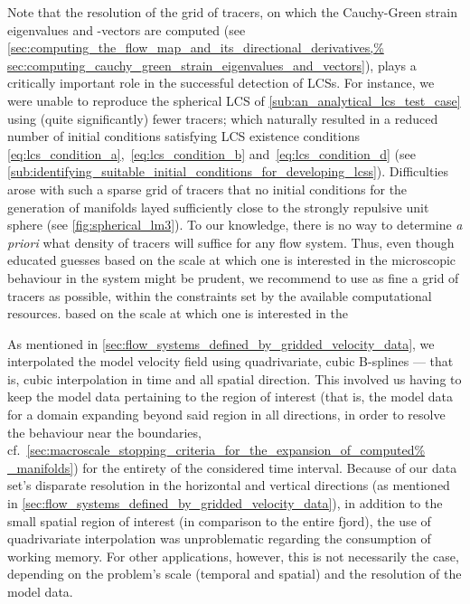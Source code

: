 Note that the resolution of the grid of tracers, on which the Cauchy-Green
strain eigenvalues and -vectors are computed (see
\cref{sec:computing_the_flow_map_and_its_directional_derivatives,%
sec:computing_cauchy_green_strain_eigenvalues_and_vectors}), plays a critically
important role in the successful detection of LCSs. For instance, we were
unable to reproduce the spherical LCS of \cref{sub:an_analytical_lcs_test_case}
using (quite significantly) fewer tracers; which naturally resulted in a
reduced number of initial conditions satisfying LCS existence conditions~
\eqref{eq:lcs_condition_a},~\eqref{eq:lcs_condition_b}
and~\eqref{eq:lcs_condition_d} (see
\cref{sub:identifying_suitable_initial_conditions_for_developing_lcss}).
Difficulties arose with such a sparse grid of tracers that no initial
conditions for the generation of manifolds layed sufficiently close to the
strongly repulsive unit sphere (see \cref{fig:spherical_lm3}). To our
knowledge, there is no way to determine \emph{a priori} what density of tracers
will suffice for any flow system. Thus, even though educated guesses based on
the scale at which one is interested in the microscopic behaviour in the system
might be prudent, we recommend to use as fine a grid of tracers as possible,
within the constraints set by the available computational resources.
based on the scale at which one is interested in the

As mentioned in \cref{sec:flow_systems_defined_by_gridded_velocity_data}, we
interpolated the model velocity field using quadrivariate, cubic B-splines ---
that is, cubic interpolation in time and all spatial direction. This involved
us having to keep the model data pertaining to the region of interest (that is,
the model data for a domain expanding beyond said region in all directions, in
order to resolve the behaviour near the boundaries, cf.\
\cref{sec:macroscale_stopping_criteria_for_the_expansion_of_computed%
_manifolds}) for the entirety of the considered time interval. Because of our
data set's disparate resolution in the horizontal and vertical directions
(as mentioned in \cref{sec:flow_systems_defined_by_gridded_velocity_data}), in
addition to the small spatial region of interest (in comparison to the entire
fjord), the use of quadrivariate interpolation was unproblematic regarding
the consumption of working memory. For other applications, however, this is not
necessarily the case, depending on the problem's scale (temporal and spatial)
and the resolution of the model data.

